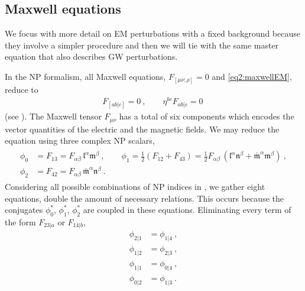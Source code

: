 \subsection{Maxwell equations}

We focus with more detail on EM perturbations with a fixed background because they involve a simpler procedure and then we will tie with the same master equation that also describes GW perturbations. 
 
In the NP formalism, all Maxwell equations, $F_{[\mu\nu; \rho]}=0$ and \eqref{eq2:maxwellEM}, reduce to
\begin{align}
    \label{eq3:maxwellFabEqs}
    F_{[ab \rvert c]} = 0 ~,\qquad \eta^{bc} F_{ab \rvert c} = 0 ~
\end{align}
(see ).
The Maxwell tensor $F_{\mu\nu}$ has a total of six components which encodes the vector quantities of the electric and the magnetic fields. We may reduce the equation using three complex NP scalars,
\begin{align}
    \label{eq3:maxwellNPphi}
    \begin{split}
        \phi_0 &= F_{13} = F_{\alpha\beta} \,\mathfrak{l}^\alpha \mathfrak{m}^\beta ~,\qquad
        \phi_1 = \tfrac{1}{2} (F_{12} + F_{43}) = \tfrac{1}{2} F_{\alpha\beta} \,(\mathfrak{l}^\alpha \mathfrak{n}^\beta + \bar{\mathfrak{m}}^\alpha \mathfrak{m}^\beta) ~,\\
        \phi_2 &= F_{42} = F_{\alpha\beta} \,\bar{\mathfrak{m}}^\alpha \mathfrak{n}^\beta ~.
    \end{split}
\end{align}
Considering all possible combinations of NP indices in , we gather eight equations, double the amount of necessary relations. 
This occurs because the conjugates $\phi_0^*$, $\phi_1^*$, $\phi_2^*$ are coupled in these equations. Eliminating every term of the form $F_{23\rvert a}$ or $F_{14\rvert b}$, 
\begin{subequations}
    \begin{align}
        \phi_{2\rvert 1} &= \phi_{1\rvert 4} ~, \label{eq3:phi21phi14}\\
        \phi_{1\rvert 2} &= \phi_{2\rvert 3} ~, \label{eq3:phi12phi23}\\
        \phi_{1\rvert 1} &= \phi_{0\rvert 4} ~, \label{eq3:phi11phi04}\\
        \phi_{0\rvert 2} &= \phi_{1\rvert 3} ~. \label{eq3:phi02phi13}
    \end{align}
\end{subequations}
